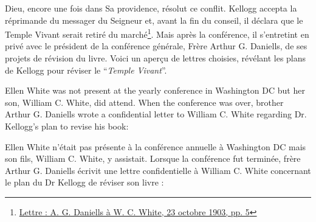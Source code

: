 Dieu, encore une fois dans Sa providence, résolut ce conflit. Kellogg accepta la réprimande du messager du Seigneur et, avant la fin du conseil, il déclara que le Temple Vivant serait retiré du marché\footnote{\href{https://forgottenpillar.com/wp-content/uploads/2022/04/Letter-A-G-Daniells-to-W-C-White-October-29-1903.pdf}{Lettre : A. G. Daniells à W. C. White, 23 octobre 1903, pp. 5}}. Mais après la conférence, il s'entretint en privé avec le président de la conférence générale, Frère Arthur G. Daniells, de ses projets de révision du livre. Voici un aperçu de lettres choisies, révélant les plans de Kellogg pour réviser le “\textit{Temple Vivant}”.


Ellen White was not present at the yearly conference in Washington DC but her son, William C. White, did attend. When the conference was over, brother Arthur G. Daniells wrote a confidential letter to William C. White regarding Dr. Kellogg's plan to revise his book:


Ellen White n'était pas présente à la conférence annuelle à Washington DC mais son fils, William C. White, y assistait. Lorsque la conférence fut terminée, frère Arthur G. Daniells écrivit une lettre confidentielle à William C. White concernant le plan du Dr Kellogg de réviser son livre :










